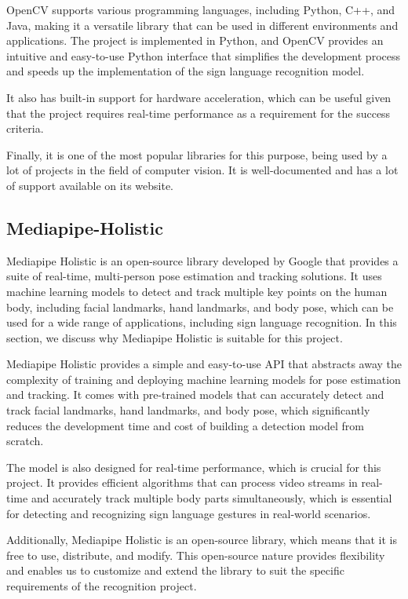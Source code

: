 \documentclass[final,rdr32.tex]{subfiles}
\begin{document}
OpenCV supports various programming languages, including Python, C++, and Java, making it a versatile library that can be used in different environments and applications. The project is implemented in Python, and OpenCV provides an intuitive and easy-to-use Python interface that simplifies the development process and speeds up the implementation of the sign language recognition model.

It also has built-in support for hardware acceleration, which can be useful given that the project requires real-time performance as a requirement for the success criteria.

Finally, it is one of the most popular libraries for this purpose, being used by a lot of projects in the field of computer vision. It is well-documented and has a lot of support available on its website.

\subsection{Mediapipe-Holistic}

Mediapipe Holistic is an open-source library developed by Google that provides a suite of real-time, multi-person pose estimation and tracking solutions. It uses machine learning models to detect and track multiple key points on the human body, including facial landmarks, hand landmarks, and body pose, which can be used for a wide range of applications, including sign language recognition. In this section, we discuss why Mediapipe Holistic is suitable for this project.

Mediapipe Holistic provides a simple and easy-to-use API that abstracts away the complexity of training and deploying machine learning models for pose estimation and tracking. It comes with pre-trained models that can accurately detect and track facial landmarks, hand landmarks, and body pose, which significantly reduces the development time and cost of building a detection model from scratch.

The model is also designed for real-time performance, which is crucial for this project. It provides efficient algorithms that can process video streams in real-time and accurately track multiple body parts simultaneously, which is essential for detecting and recognizing sign language gestures in real-world scenarios.

Additionally, Mediapipe Holistic is an open-source library, which means that it is free to use, distribute, and modify. This open-source nature provides flexibility and enables us to customize and extend the library to suit the specific requirements of the recognition project.
\end{document}

